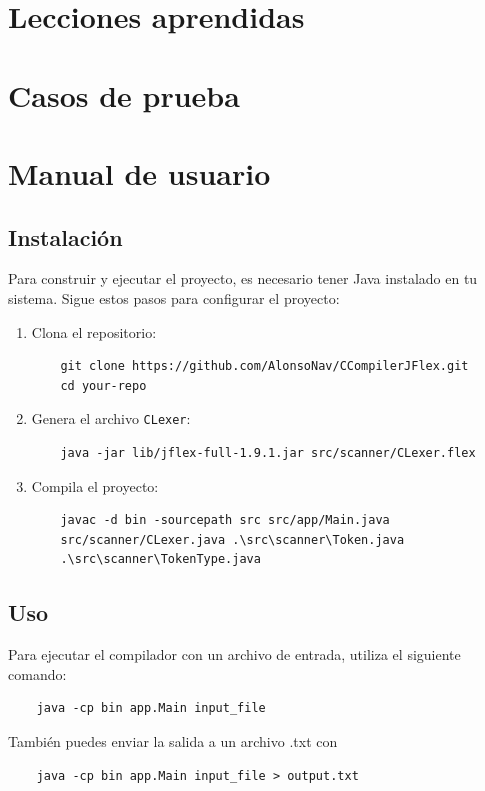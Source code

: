\documentclass[a4paper,12pt]{article}
\begin{document}
\section*{Lecciones aprendidas}

\section*{Casos de prueba}

\section*{Manual de usuario}
\subsection*{Instalación}
Para construir y ejecutar el proyecto, es necesario tener Java instalado en tu sistema. Sigue estos pasos para configurar el proyecto:

\begin{enumerate}
    \item Clona el repositorio:
    \begin{verbatim}
    git clone https://github.com/AlonsoNav/CCompilerJFlex.git
    cd your-repo
    \end{verbatim}

    \item Genera el archivo \texttt{CLexer}:
    \begin{verbatim}
    java -jar lib/jflex-full-1.9.1.jar src/scanner/CLexer.flex
    \end{verbatim}

    \item Compila el proyecto:
    \begin{verbatim}
    javac -d bin -sourcepath src src/app/Main.java 
    src/scanner/CLexer.java .\src\scanner\Token.java 
    .\src\scanner\TokenType.java 
    \end{verbatim}
\end{enumerate}

\subsection*{Uso}
Para ejecutar el compilador con un archivo de entrada, utiliza el siguiente comando:
\begin{verbatim}
    java -cp bin app.Main input_file
\end{verbatim}
También puedes enviar la salida a un archivo .txt con
\begin{verbatim}
    java -cp bin app.Main input_file > output.txt
\end{verbatim}
\end{document}
